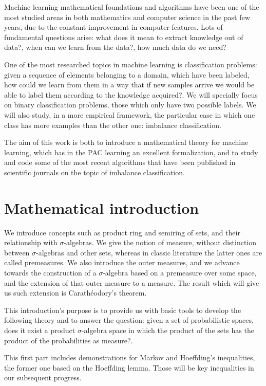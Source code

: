 Machine learning mathematical foundations and algorithms have been one of the most studied areas in both mathematics and 
computer science in the past few years, due to the constant improvement in computer features. Lots of fundamental questions 
arise: what does it mean to extract knowledge out of data?, when can we learn from the data?, how much data do we need?

One of the most researched topics in machine learning is classification problems: given a sequence of elements belonging to
a domain, which have been labeled, how could we learn from them in a way that if new samples arrive we would be able to 
label them according to the knowledge acquired?. We will specially focus on binary classification problems, those which 
only have two possible labels. We will also study, in a more empirical framework, the particular case in which one 
class has more examples than the other one: imbalance classification.

The aim of this work is both to introduce a mathematical theory for machine learning, which has in the PAC learning 
an excellent formalization, and to study and code some of the most recent algorithms that have been published in scientific
journals on the topic of imbalance classification.

\section*{Mathematical introduction}
We introduce concepts such as product ring and semiring of sets, and their relationship with $\sigma$-algebras. We give
the notion of measure, without distinction between $\sigma$-algebras and other sets, whereas in classic literature the latter
ones are called premeasures. We also introduce the outer measures, and we advance towards the construction of a $\sigma$-algebra
based on a premeasure over some space, and the extension of that outer measure to a measure. The result which will give us
such extension is Carathéodory's theorem.

This introduction's purpose is to provide us with basic tools to develop the following theory and to answer the question:
given a set of probabilistic spaces, does it exist a product $\sigma$-algebra space in which the product of the sets has
the product of the probabilities as measure?.

This first part includes demonstrations for Markov and Hoeffding's inequalities, the former one based on the Hoeffding
lemma. Those will be key inequalities in our subsequent progress.

